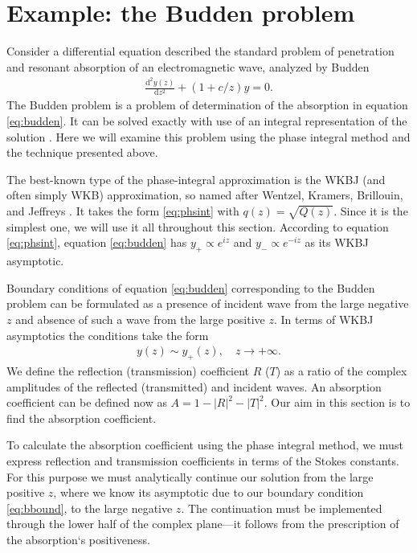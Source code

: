 \documentclass[aip,jmp,reprint]{revtex4-1}
\def\rmd{\mathrm{d}}
\newcommand\phsintgrnd[1][z]{q(#1)}
\begin{document}
\section{Example: the Budden problem \label{sec:budden}}
Consider a differential equation described the standard problem of penetration and 
resonant absorption of an electromagnetic wave, analyzed by Budden\cite{white-chen,budden}
\begin{eqnarray}
\frac{\rmd^2 y(z)}{\rmd z^2} + (1+c/z)y = 0.  
\label{eq:budden}
\end{eqnarray}
The Budden problem is a problem of determination of the absorption in equation \eqref{eq:budden}. 
It can be solved exactly with use of an integral representation of the solution \cite{rwbook}.
Here we will examine this problem using the phase integral method and the technique presented above. 

The best-known type of the phase-integral approximation is the WKBJ (and often simply WKB) approximation, 
so named after Wentzel, Kramers, Brillouin, and Jeffreys \cite{wkb1,wkb2,wkb3,wkbj}. 
It takes the form \eqref{eq:phsint} with $\phsintgrnd = \sqrt{Q(z)}$. Since it is the simplest one,
we will use it all throughout this section. According to equation \eqref{eq:phsint}, 
equation \eqref{eq:budden} has $y_+ \propto e^{iz}$ and $y_- \propto e^{-iz}$ as its WKBJ asymptotic. 

Boundary conditions of equation \eqref{eq:budden} corresponding to the Budden problem can be
formulated as a presence of incident wave from the large negative $z$ and absence of such 
a wave from the large positive $z$. In terms of WKBJ asymptotics the conditions take the form
\begin{eqnarray}
y(z) \sim y_+(z), \quad z \rightarrow +\infty.  
\label{eq:bbound}
\end{eqnarray}
We define the reflection (transmission) coefficient $R$ ($T$) as
a ratio of the complex amplitudes of the reflected (transmitted) and incident waves. 
An absorption coefficient can be defined now as $A = 1 - |R|^2 - |T|^2$. Our aim in this
section is to find the absorption coefficient.

To calculate the absorption coefficient using the phase integral method, we must express 
reflection and transmission coefficients in terms of the Stokes constants. 
For this purpose we must analytically continue our solution from the large positive $z$,
where we know its asymptotic due to our boundary condition \eqref{eq:bbound}, to
the large negative $z$. The continuation must be implemented through the lower half of the
complex plane---it follows from the prescription of the absorption`s positiveness\cite{rwbook}.
\end{document}

